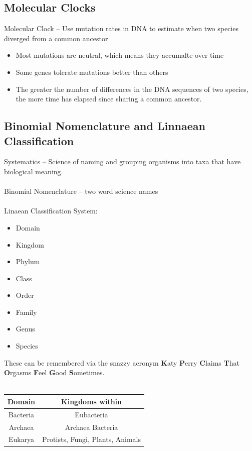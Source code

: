 \documentclass{article}
\begin{document}
\subsection{Molecular Clocks}
Molecular Clock -- Use mutation rates in DNA to estimate when two species diverged from a common ancestor
\begin{itemize}
\item Most mutations are neutral, which means they accumalte over time
\item Some genes tolerate mutations better than others
\item The greater the number of differences in the DNA sequences of two species, the more time has elapsed since sharing a common ancestor.
\end{itemize}

\subsection{Binomial Nomenclature and Linnaean Classification}
Systematics -- Science of naming and grouping organisms into taxa that have biological meaning.\\
\\
Binomial Nomenclature -- two word science names\\
\\
Linaean Classification System:
\begin{itemize}
\item Domain
\item Kingdom
\item Phylum
\item Class
\item Order
\item Family
\item Genus
\item Species
\end{itemize}
These can be remembered via the snazzy acronym \textbf{K}aty \textbf{P}erry \textbf{C}laims \textbf{T}hat \textbf{O}rgasms \textbf{F}eel \textbf{G}ood \textbf{S}ometimes.\\
\\
\begin{tabular}{| c | c |}
\hline
Domain & Kingdoms within\\
\hline
Bacteria & Eubacteria\\
\hline
Archaea & Archaea Bacteria\\
\hline
Eukarya & Protists, Fungi, Plants, Animals\\
\hline

\end{tabular}
\newpage
\end{document}
